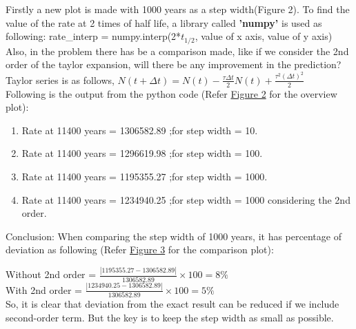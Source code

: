 \documentclass[11pt]{article}
\begin{document}
Firstly a new plot is made with 1000 years as a step width(Figure 2).
To find the value of the rate at 2 times of half life, a library called \textbf{'numpy'} is used as following: rate\_interp = numpy.interp(2*$t_{1/2}$, value of x axis, value of y axis)
Also, in the problem there has be a comparison made, like if we consider the 2nd order of the taylor expansion, will there be any improvement in the prediction?
Taylor series is as follows,
$N(t+\Delta t) = N(t) - \frac{\tau \Delta t}{2} N(t) + \frac{\tau^2 (\Delta t)^2}{2}$\\
Following is the output from the python code (Refer \hyperref[fig:Rate of radioactive decay for step width = 10, 100, 1000]{Figure 2} for the overview plot):
\begin{enumerate}
    \item Rate at 11400 years = 1306582.89 ;for step width = 10.
    \item Rate at 11400 years = 1296619.98 ;for step width = 100.
    \item Rate at 11400 years = 1195355.27 ;for step width = 1000.
    \item Rate at 11400 years = 1234940.25 ;for step width = 1000 considering the 2nd order.
\end{enumerate}
Conclusion: When comparing the step width of 1000 years, it has percentage of deviation as following (Refer \hyperref[fig:Rate of radioactive decay for step width = 1000, with 2nd order term]{Figure 3} for the comparison plot):
\begin{raggedright}
\begin{justify}
Without 2nd order = $\frac{\left|1195355.27 - 1306582.89\right|}{1306582.89} \times 100 = 8\%$\\
With 2nd order = $\frac{\left|1234940.25 - 1306582.89\right|}{1306582.89} \times 100 = 5\% $\\
So, it is clear that deviation from the exact result can be reduced if we include second-order term. But the key is to keep the step width as small as possible.
\end{justify}
\end{raggedright}
\end{document}
